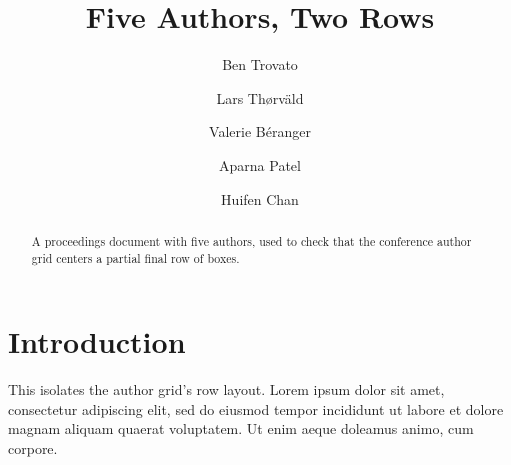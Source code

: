 \documentclass[sigconf]{acmart}
\begin{document}
\title{Five Authors, Two Rows}

\author{Ben Trovato}

\author{Lars Th{\o}rv{\"a}ld}

\author{Valerie B\'eranger}

\author{Aparna Patel}

\author{Huifen Chan}

\begin{abstract}
  A proceedings document with five authors, used to check that the conference
  author grid centers a partial final row of boxes.
\end{abstract}

\maketitle

\section{Introduction}
This isolates the author grid's row layout. Lorem ipsum dolor sit amet,
consectetur adipiscing elit, sed do eiusmod tempor incididunt ut labore et dolore
magnam aliquam quaerat voluptatem. Ut enim aeque doleamus animo, cum corpore.
\end{document}
